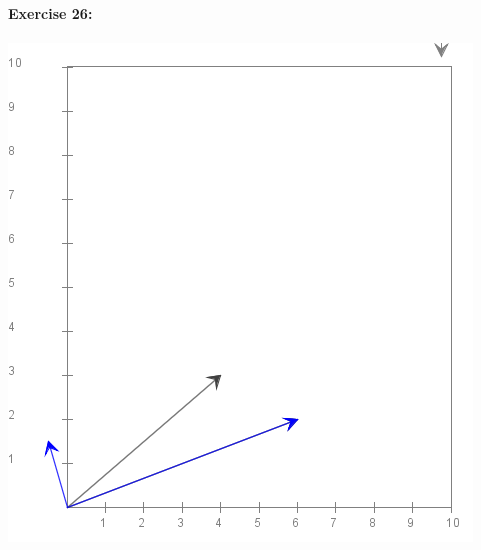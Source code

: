 \documentclass[10pt]{article}
\begin{document}
	\textbf{\large Exercise 26:}\\\\
	\includegraphics[scale=.5]{module7_exercise26}
	
\end{document}
